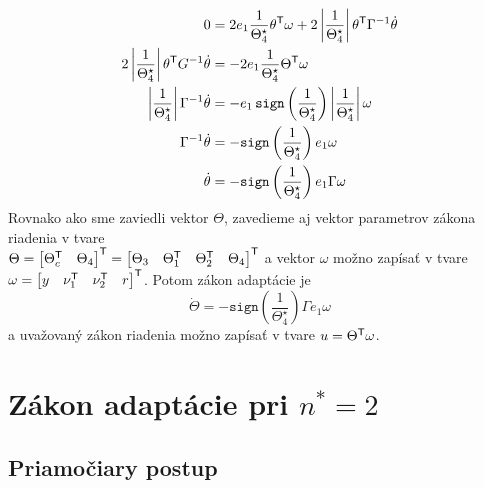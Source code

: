 ﻿\documentclass[a4paper, 10pt, ]{article}
\begin{document}
\begin{subequations}
	\begin{align}
	0 &= 2 e_1 \frac{1}{\Theta_4^\star} \theta^{\mathsf{T}} \omega + 2 \left| \frac{1}{\Theta_4^\star} \right| \theta^{\mathsf{T}} \Gamma^{-1} \dot{\theta} \\
	2 \left| \frac{1}{\Theta_4^\star} \right| \theta^{\mathsf{T}} G^{-1} \dot{\theta} &= - 2 e_1 \frac{1}{\Theta_4^\star} \Theta^{\mathsf{T}} \omega \\
	\left| \frac{1}{\Theta_4^\star} \right| \Gamma^{-1} \dot{\theta} &= - e_1 \, \texttt{sign}\left(\frac{1}{\Theta_4^\star}\right) \left| \frac{1}{\Theta_4^\star} \right| \omega \\
	\Gamma^{-1} \dot{\theta} &= - \texttt{sign}\left(\frac{1}{\Theta_4^\star}\right) e_1 \omega \\
	\dot{\theta} &= - \texttt{sign}\left(\frac{1}{\Theta_4^\star}\right) e_1 \Gamma \omega
	\end{align}
\end{subequations}
Rovnako ako sme zaviedli vektor $\Theta$, zavedieme aj vektor parametrov zákona riadenia v tvare \\ $\Theta = \begin{bmatrix} \Theta_c^{\mathsf{T}} & \Theta_4 \end{bmatrix}^{\mathsf{T}} = \begin{bmatrix} {\Theta}_3 & \Theta_1^{\mathsf{T}} & \Theta_2^{\mathsf{T}} & \Theta_4 \end{bmatrix}^{\mathsf{T}}$ a vektor $\omega$ možno zapísať v tvare $\omega = \begin{bmatrix} y & \nu_1^{\mathsf{T}} & \nu_2^{\mathsf{T}} & r \end{bmatrix}^{\mathsf{T}}$. Potom zákon adaptácie je
\begin{equation}
	\dot{\Theta} = - \texttt{sign}\left(\frac{1}{\Theta_4^\star}\right) \Gamma e_1 \omega
\end{equation}
a uvažovaný zákon riadenia možno zapísať v tvare $u = \Theta^{\mathsf{T}} \omega$.











\section{Zákon adaptácie pri $n^* = 2$}




\subsection{Priamočiary postup}
\end{document}

